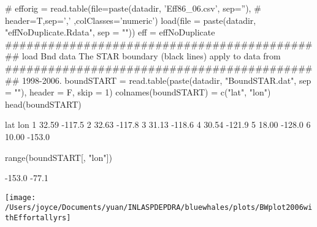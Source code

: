 \documentclass[a4paper]{article}\usepackage[]{graphicx}\usepackage[]{color}
\begin{document}
\begin{Schunk}
\begin{Sinput}
# efforig = read.table(file=paste(datadir, 'Eff86_06.csv', sep=''),
# header=T,sep=',' ,colClasses='numeric')
load(file = paste(datadir, "effNoDuplicate.Rdata", sep = ""))
eff = effNoDuplicate
############################################# load Bnd data The STAR boundary (black lines) apply to data from
############################################# 1998-2006.
boundSTART = read.table(paste(datadir, "BoundSTAR.dat", sep = ""), 
    header = F, skip = 1)
colnames(boundSTART) = c("lat", "lon")
head(boundSTART)
\end{Sinput}
\begin{Soutput}
    lat    lon
1 32.59 -117.5
2 32.63 -117.8
3 31.13 -118.6
4 30.54 -121.9
5 18.00 -128.0
6 10.00 -153.0
\end{Soutput}
\begin{Sinput}
range(boundSTART[, "lon"])
\end{Sinput}
\begin{Soutput}
[1] -153.0  -77.1
\end{Soutput}


{\centering \texttt{[image: /Users/joyce/Documents/yuan/INLASPDEPDRA/bluewhales/plots/BWplot2006withEffortallyrs]} 

}

\end{Schunk}
\end{document}
